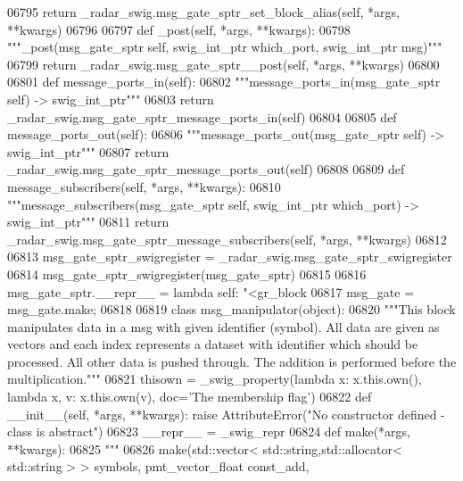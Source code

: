 \begin{DoxyCode}
{{{{{{{{{{{{{{{{{{{{{{06795         \textcolor{keywordflow}{return} \_radar\_swig.msg\_gate\_sptr\_set\_block\_alias(self, *args, **kwargs)
06796 
06797     \textcolor{keyword}{def }_post(self, *args, **kwargs):
06798         \textcolor{stringliteral}{"""\_post(msg\_gate\_sptr self, swig\_int\_ptr which\_port, swig\_int\_ptr msg)"""}
06799         \textcolor{keywordflow}{return} \_radar\_swig.msg\_gate\_sptr\_\_post(self, *args, **kwargs)
06800 
06801     \textcolor{keyword}{def }message_ports_in(self):
06802         \textcolor{stringliteral}{"""message\_ports\_in(msg\_gate\_sptr self) -> swig\_int\_ptr"""}
06803         \textcolor{keywordflow}{return} \_radar\_swig.msg\_gate\_sptr\_message\_ports\_in(self)
06804 
06805     \textcolor{keyword}{def }message_ports_out(self):
06806         \textcolor{stringliteral}{"""message\_ports\_out(msg\_gate\_sptr self) -> swig\_int\_ptr"""}
06807         \textcolor{keywordflow}{return} \_radar\_swig.msg\_gate\_sptr\_message\_ports\_out(self)
06808 
06809     \textcolor{keyword}{def }message_subscribers(self, *args, **kwargs):
06810         \textcolor{stringliteral}{"""message\_subscribers(msg\_gate\_sptr self, swig\_int\_ptr which\_port) -> swig\_int\_ptr"""}
06811         \textcolor{keywordflow}{return} \_radar\_swig.msg\_gate\_sptr\_message\_subscribers(self, *args, **kwargs)
06812 
06813 msg\_gate\_sptr\_swigregister = \_radar\_swig.msg\_gate\_sptr\_swigregister
06814 msg_gate_sptr_swigregister(msg\_gate\_sptr)
06815 
06816 msg\_gate\_sptr.\_\_repr\_\_ = \textcolor{keyword}{lambda} self: \textcolor{stringliteral}{"<gr\_block %
06817 msg\_gate = msg\_gate.make;
06818 
06819 \textcolor{keyword}{class }msg_manipulator(object):
06820     \textcolor{stringliteral}{"""This block manipulates data in a msg with given identifier (symbol). All data are given as vectors
       and each index represents a dataset with identifier which should be processed. All other data is pushed
       through. The addition is performed before the multiplication."""}
06821     thisown = _swig_property(\textcolor{keyword}{lambda} x: x.this.own(), \textcolor{keyword}{lambda} x, v: x.this.own(v), doc=\textcolor{stringliteral}{'The membership flag'})
06822     \textcolor{keyword}{def }__init__(self, *args, **kwargs): \textcolor{keywordflow}{raise} AttributeError(\textcolor{stringliteral}{"No constructor defined - class is abstract"})
06823     \_\_repr\_\_ = \_swig\_repr
06824     \textcolor{keyword}{def }make(*args, **kwargs):
06825         \textcolor{stringliteral}{"""}
06826 \textcolor{stringliteral}{        make(std::vector< std::string,std::allocator< std::string > > symbols, pmt\_vector\_float const\_add, }
}}}}}}}}}}}}}}}}}}}}}}}
\end{DoxyCode}

